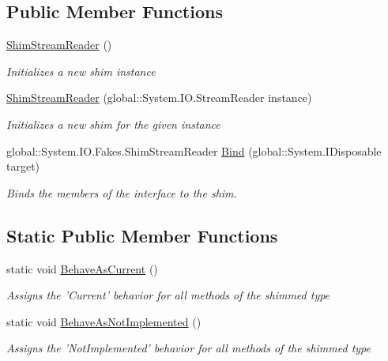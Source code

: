 \subsection*{Public Member Functions}
\begin{DoxyCompactItemize}
\item 
\hyperlink{class_system_1_1_i_o_1_1_fakes_1_1_shim_stream_reader_aa10d96f8645803d97e221996e70869c5}{Shim\-Stream\-Reader} ()
\begin{DoxyCompactList}\small\item\em Initializes a new shim instance\end{DoxyCompactList}\item 
\hyperlink{class_system_1_1_i_o_1_1_fakes_1_1_shim_stream_reader_aeb10178250cdd0d01e3b3314257098ed}{Shim\-Stream\-Reader} (global\-::\-System.\-I\-O.\-Stream\-Reader instance)
\begin{DoxyCompactList}\small\item\em Initializes a new shim for the given instance\end{DoxyCompactList}\item 
global\-::\-System.\-I\-O.\-Fakes.\-Shim\-Stream\-Reader \hyperlink{class_system_1_1_i_o_1_1_fakes_1_1_shim_stream_reader_a81f4548db755c9434930e0cafb35a01b}{Bind} (global\-::\-System.\-I\-Disposable target)
\begin{DoxyCompactList}\small\item\em Binds the members of the interface to the shim.\end{DoxyCompactList}\end{DoxyCompactItemize}
\subsection*{Static Public Member Functions}
\begin{DoxyCompactItemize}
\item 
static void \hyperlink{class_system_1_1_i_o_1_1_fakes_1_1_shim_stream_reader_a2d1c781553a13b52b05aad2acd502d6d}{Behave\-As\-Current} ()
\begin{DoxyCompactList}\small\item\em Assigns the 'Current' behavior for all methods of the shimmed type\end{DoxyCompactList}\item 
static void \hyperlink{class_system_1_1_i_o_1_1_fakes_1_1_shim_stream_reader_a35f1029323af2f0484ff2fb5649d18b1}{Behave\-As\-Not\-Implemented} ()
\begin{DoxyCompactList}\small\item\em Assigns the 'Not\-Implemented' behavior for all methods of the shimmed type\end{DoxyCompactList}\end{DoxyCompactItemize}
